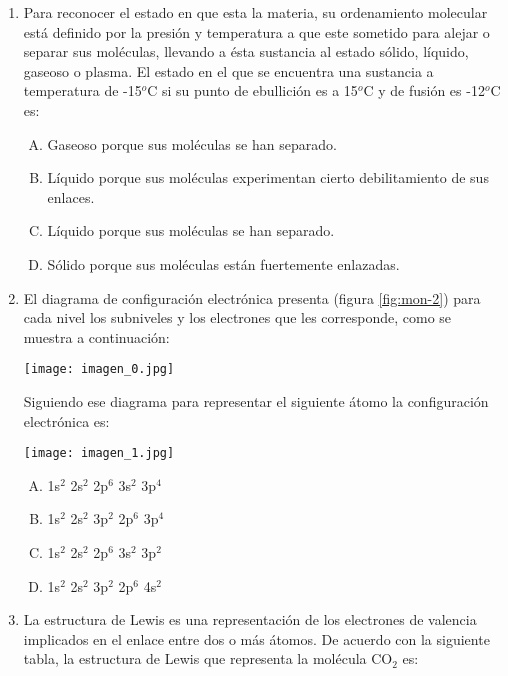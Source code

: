 
\begin{enumerate}
\item Para reconocer el estado en que esta la materia, su ordenamiento molecular está definido por la presión y temperatura a que este sometido para alejar o separar sus moléculas, llevando a ésta sustancia al estado sólido, líquido, gaseoso o plasma. El estado en el que se encuentra una sustancia a temperatura de -15$^o$C si su punto de ebullición es a 15$^o$C y de fusión es -12$^o$C es: \label{mon-1}


\begin{enumerate}[(A)]
\item Gaseoso porque sus moléculas se han separado.
\item Líquido porque sus moléculas experimentan cierto debilitamiento de sus enlaces. 
\item Líquido porque sus moléculas se han separado. 
\item Sólido porque sus moléculas están fuertemente enlazadas. 
\end{enumerate}

\item El diagrama de configuración electrónica presenta (figura \ref{fig:mon-2}) para cada nivel los subniveles y los electrones que les corresponde, como se muestra a continuación: \label{mon-2}

\texttt{[image: imagen\_0.jpg]}
\justifying

Siguiendo ese diagrama para representar el siguiente átomo la configuración electrónica es:

\texttt{[image: imagen\_1.jpg]}
\justifying

\begin{enumerate}[(A)]
\item 1s$^2$ 2s$^2$ 2p$^6$ 3s$^2$ 3p$^4$
\item 1s$^2$ 2s$^2$ 3p$^2$ 2p$^6$ 3p$^4$
\item 1s$^2$ 2s$^2$ 2p$^6$ 3s$^2$ 3p$^2$
\item 1s$^2$ 2s$^2$ 3p$^2$ 2p$^6$ 4s$^2$
\end{enumerate}

\item La estructura de Lewis es una representación de los electrones de valencia implicados en el enlace entre dos o más átomos. De acuerdo con la siguiente tabla, la estructura de Lewis que representa la molécula CO$_2$ es:\label{mon-3}



\end{enumerate}
